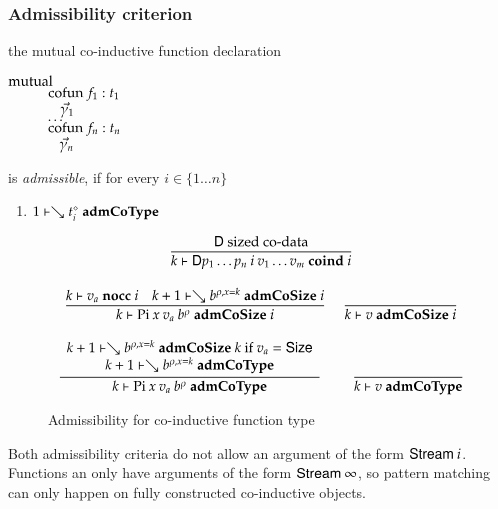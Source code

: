 \subsubsection{Admissibility criterion}
the mutual co-inductive function declaration
\begin{bsp}
$\mathrm{mutual}\:$\\
$\spcx \cofun f_1 : t_1 $\\
$\spcx \spc \vec{\gamma}_1$\\
$\spcx \ldots$\\
$\spcx \cofun f_n : t_n $\\
$\spcx \spc \vec{\gamma}_n$
\end{bsp}
is \emph{admissible}, if  for every $i \in \{1 \ldots n \}  $
\begin{enumerate}
\item
$1\vdash\searrow t_i^{\diamond}\mbox{ \textbf{admCoType}}$
\end{enumerate}

\begin{figure}
\begin{gather*}
\ \dfrac{\mathsf{D} \mbox{ sized co-data}}{k\vdash\mathsf{D} p_1 \ldots p_n \: i \: v_1 \ldots v_m\mbox{ \textbf{coind} }i}
\\[2ex]
\ \dfrac{k\vdash v_a\mbox{ \textbf{nocc} }i
\quad
k+1\vdash\searrow b^{\rho,x=k}\mbox{ \textbf{admCoSize} }i}{k\vdash\mathrm{Pi} \: x \: v_a \: b^{\rho}\mbox{ \textbf{admCoSize} }i}
\quad
\ \dfrac{}{k\vdash v\mbox{ \textbf{admCoSize} }i}
\\[2ex]
\ \dfrac{\begin{array}[b]{c}k+1\vdash\searrow b^{\rho,x=k}\mbox{ \textbf{admCoSize} }k \mbox{ if } v_a = \mathsf{Size}\\k+1\vdash\searrow b^{\rho,x=k}\mbox{ \textbf{admCoType}}\end{array}}{k\vdash\mathrm{Pi} \: x \: v_a \: b^{\rho}\mbox{ \textbf{admCoType}}}
\qquad
\ \dfrac{}{k\vdash v\mbox{ \textbf{admCoType}}}
\end{gather*}
\caption{Admissibility for co-inductive function type}
\end{figure}

Both admissibility criteria do not allow an argument of the form $\mathsf{Stream}\: i$.
Functions an only have arguments of the form $\mathsf{Stream}\: \infty$, so pattern matching can only 
happen on fully constructed co-inductive objects.


